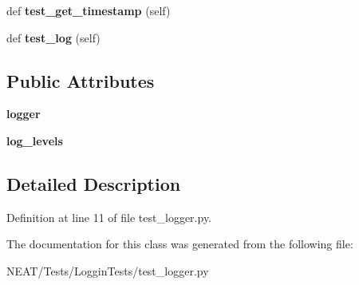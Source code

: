 \begin{DoxyCompactItemize}
\item 
def {\bfseries test\+\_\+get\+\_\+timestamp} (self)\hypertarget{class_n_e_a_t___py_genetics_1_1_n_e_a_t_1_1_tests_1_1_loggin_tests_1_1test__logger_1_1_test_logger_ab51462f3f6f4788823143a1ff1687313}{}\label{class_n_e_a_t___py_genetics_1_1_n_e_a_t_1_1_tests_1_1_loggin_tests_1_1test__logger_1_1_test_logger_ab51462f3f6f4788823143a1ff1687313}

\item 
def {\bfseries test\+\_\+log} (self)\hypertarget{class_n_e_a_t___py_genetics_1_1_n_e_a_t_1_1_tests_1_1_loggin_tests_1_1test__logger_1_1_test_logger_aade1a9d41eb3507b7c054c531e308e59}{}\label{class_n_e_a_t___py_genetics_1_1_n_e_a_t_1_1_tests_1_1_loggin_tests_1_1test__logger_1_1_test_logger_aade1a9d41eb3507b7c054c531e308e59}

\end{DoxyCompactItemize}
\subsection*{Public Attributes}
\begin{DoxyCompactItemize}
\item 
{\bfseries logger}\hypertarget{class_n_e_a_t___py_genetics_1_1_n_e_a_t_1_1_tests_1_1_loggin_tests_1_1test__logger_1_1_test_logger_acaa9869276882a1e8f820a766f5336e9}{}\label{class_n_e_a_t___py_genetics_1_1_n_e_a_t_1_1_tests_1_1_loggin_tests_1_1test__logger_1_1_test_logger_acaa9869276882a1e8f820a766f5336e9}

\item 
{\bfseries log\+\_\+levels}\hypertarget{class_n_e_a_t___py_genetics_1_1_n_e_a_t_1_1_tests_1_1_loggin_tests_1_1test__logger_1_1_test_logger_a50686c745b18eb916543061489b43508}{}\label{class_n_e_a_t___py_genetics_1_1_n_e_a_t_1_1_tests_1_1_loggin_tests_1_1test__logger_1_1_test_logger_a50686c745b18eb916543061489b43508}

\end{DoxyCompactItemize}


\subsection{Detailed Description}


Definition at line 11 of file test\+\_\+logger.\+py.



The documentation for this class was generated from the following file\+:\begin{DoxyCompactItemize}
\item 
N\+E\+A\+T/\+Tests/\+Loggin\+Tests/test\+\_\+logger.\+py\end{DoxyCompactItemize}
